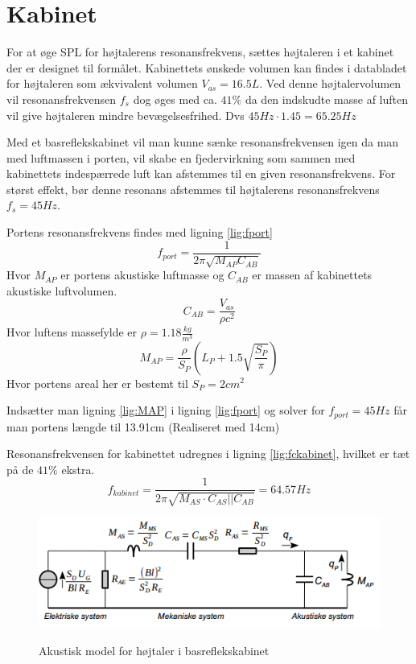\section{Kabinet}

For at øge SPL for højtalerens resonansfrekvens, sættes højtaleren i et kabinet der er designet til formålet.
Kabinettets ønskede volumen kan findes i databladet for højtaleren\cite{FW168} som ækvivalent volumen $V_{as} = 16.5L$. Ved denne højtalervolumen vil resonansfrekvensen $f_s$ dog øges med ca. $41\%$ da den indskudte masse af luften vil give højtaleren mindre bevægelsesfrihed. Dvs $45Hz\cdot1.45=65.25Hz$

Med et basreflekskabinet vil man kunne sænke resonansfrekvensen igen da man med luftmassen i porten, vil skabe en fjedervirkning som sammen med kabinettets indespærrede luft kan afstemmes til en given resonansfrekvens. For størst effekt, bør denne resonans afstemmes til højtalerens resonansfrekvens $f_s = 45Hz$.

Portens resonansfrekvens findes med ligning \ref{lig:fport}
\begin{equation}\label{lig:fport}
f_{port}=\frac{1}{2 \pi \sqrt{M_{AP} C_{AB}}}
\end{equation}
Hvor $M_{AP}$ er portens akustiske luftmasse og $C_{AB}$ er massen af kabinettets akustiske luftvolumen.
\begin{equation}\label{lig:CAB}
C_{AB}=\frac{V_{as}}{\rho c^2}
	\end{equation}
	Hvor luftens massefylde er $\rho=1.18 \frac{kg}{m^3}$ 
\begin{equation}\label{lig:MAP}
M_{AP}=\frac{\rho}{S_P} (L_P+1.5\sqrt{\frac{S_P}{\pi}})
\end{equation}	
Hvor portens areal her er bestemt til $S_P=2cm^2$

Indsætter man ligning \ref{lig:MAP} i ligning \ref{lig:fport} og solver for $f_{port}=45Hz$ får man portens længde til 13.91cm (Realiseret med 14cm)

Resonansfrekvensen for kabinettet udregnes i ligning \ref{lig:fckabinet}, hvilket er tæt på de $41\%$ ekstra.
\begin{equation}\label{lig:fckabinet}
f_{kabinet}=\frac{1}{2 \pi \sqrt{M_{AS} \cdot C_{AS}||C_{AB}}} = 64.57Hz
\end{equation}
\begin{figure}[H]
	\centering
	\includegraphics[width=\textwidth]{Pics/Akustisk_basrefleks_model.PNG}
	\label{fig:BR_a_Model}
	\caption{Akustisk model for højtaler i basreflekskabinet \cite{Elektroakustik}} 
\end{figure}